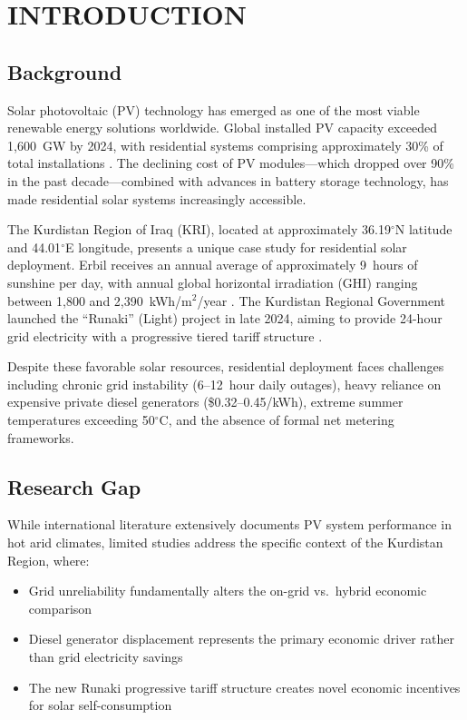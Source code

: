 \chapter{INTRODUCTION}

\section{Background}

Solar photovoltaic (PV) technology has emerged as one of the most viable renewable energy solutions worldwide. Global installed PV capacity exceeded 1,600~GW by 2024, with residential systems comprising approximately 30\% of total installations \cite{irena2024}. The declining cost of PV modules---which dropped over 90\% in the past decade---combined with advances in battery storage technology, has made residential solar systems increasingly accessible.

The Kurdistan Region of Iraq (KRI), located at approximately 36.19$^{\circ}$N latitude and 44.01$^{\circ}$E longitude, presents a unique case study for residential solar deployment. Erbil receives an annual average of approximately 9~hours of sunshine per day, with annual global horizontal irradiation (GHI) ranging between 1,800 and 2,390~kWh/m$^{2}$/year \cite{globalsolaratlas2024}. The Kurdistan Regional Government launched the ``Runaki'' (Light) project in late 2024, aiming to provide 24-hour grid electricity with a progressive tiered tariff structure \cite{krgmoe2024}.

Despite these favorable solar resources, residential deployment faces challenges including chronic grid instability (6--12~hour daily outages), heavy reliance on expensive private diesel generators (\$0.32--0.45/kWh), extreme summer temperatures exceeding 50$^{\circ}$C, and the absence of formal net metering frameworks.


\section{Research Gap}

While international literature extensively documents PV system performance in hot arid climates, limited studies address the specific context of the Kurdistan Region, where:
\begin{itemize}
    \item Grid unreliability fundamentally alters the on-grid vs.\ hybrid economic comparison
    \item Diesel generator displacement represents the primary economic driver rather than grid electricity savings
    \item The new Runaki progressive tariff structure creates novel economic incentives for solar self-consumption
\end{itemize}



